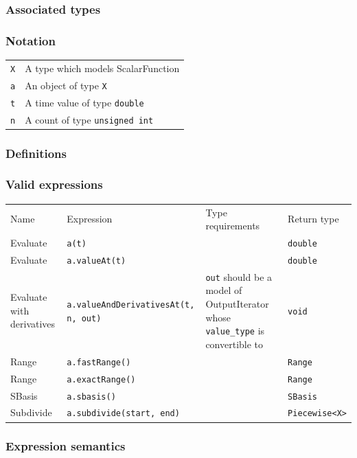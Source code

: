 \documentclass[openany]{book}
\begin{document}
\subsubsection{Associated types}

\subsubsection{Notation}

\begin{tabular}{r l}
  {\tt X} & A type which models ScalarFunction \\
  {\tt a} & An object of type {\tt X} \\
  {\tt t} & A time value of type {\tt double} \\
  {\tt n} & A count of type {\tt unsigned int} \\
\end{tabular}

\subsubsection{Definitions}

\subsubsection{Valid expressions}

\begin{tabularx}{300pt}{X l X l}
  Name & Expression & Type requirements & Return type \\
  Evaluate & {\tt a(t)} & & {\tt double} \\
  Evaluate & {\tt a.valueAt(t)} & & {\tt double} \\
  Evaluate with derivatives & {\tt a.valueAndDerivativesAt(t, n, out)} & {\tt out} should be a model of OutputIterator whose {\tt value\_type} is convertible to & {\tt void} \\
  Range & {\tt a.fastRange()} & & {\tt Range} \\
  Range & {\tt a.exactRange()} & & {\tt Range} \\
  SBasis & {\tt a.sbasis()} & & {\tt SBasis} \\
  Subdivide & {\tt a.subdivide(start, end)} & & {\tt Piecewise<X>} \\
\end{tabularx}

\subsubsection{Expression semantics}
\end{document}
